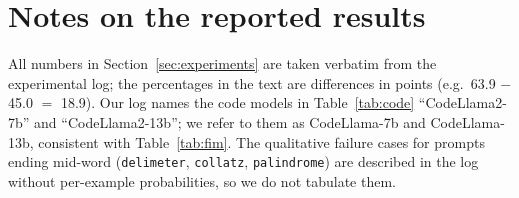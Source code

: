 \documentclass{article} %
\begin{document}
\section{Notes on the reported results}
\label{app:notes}
All numbers in Section~\ref{sec:experiments} are taken verbatim from the experimental log; the percentages in the text are differences in points (e.g.\ 63.9 $-$ 45.0 $=$ 18.9). Our log names the code models in Table~\ref{tab:code} ``CodeLlama2-7b'' and ``CodeLlama2-13b''; we refer to them as CodeLlama-7b and CodeLlama-13b, consistent with Table~\ref{tab:fim}. The qualitative failure cases for prompts ending mid-word (\texttt{delimeter}, \texttt{collatz}, \texttt{palindrome}) are described in the log without per-example probabilities, so we do not tabulate them.
\end{document}
